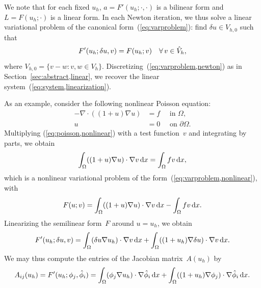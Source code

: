 We note that for each fixed $u_h$, $a = F'(u_h; \cdot, \cdot)$ is a
bilinear form and $L = F(u_h; \cdot)$ is a linear form. In each Newton
iteration, we thus solve a linear variational problem of the canonical
form~(\ref{eq:varproblem}): find $\delta u \in V_{h,0}$ such that
\begin{equation} \label{eq:varproblem,newton}
    F'(u_h; \delta u, v) = F(u_h; v) \quad \forall\, v \in \hat{V}_h,
\end{equation}
where $V_{h,0} = \{v - w: v, w \in
V_h\}$. Discretizing~(\ref{eq:varproblem,newton}) as in
Section~\ref{sec:abstract,linear}, we recover the linear
system~(\ref{eq:system,linearization}).

\begin{example}

As an example, consider the following nonlinear Poisson equation:
\begin{equation} \label{eq:poisson,nonlinear}
  \begin{split}
    - \nabla \cdot ((1+u) \nabla u) &= f \quad \mbox{ in } \Omega,
    \\
    u &= 0 \quad \mbox{ on } \partial\Omega.
  \end{split}
\end{equation}
Multiplying (\ref{eq:poisson,nonlinear}) with a test function~$v$ and
integrating by parts, we obtain
\begin{equation}
  \int_{\Omega} ((1+u) \nabla u) \cdot \nabla v \, \mathrm{d}x =
  \int_{\Omega} f v \, \mathrm{d}x,
\end{equation}
which is a nonlinear variational problem of the
form~(\ref{eq:varproblem,nonlinear}), with
\begin{equation}
  F(u; v) = \int_{\Omega} ((1+u) \nabla u) \cdot \nabla v \, \mathrm{d}x
  - \int_{\Omega} f v \, \mathrm{d}x.
\end{equation}
Linearizing the semilinear form~$F$ around $u = u_h$, we obtain
\begin{equation}
  F'(u_h; \delta u, v) =
  \int_{\Omega} (\delta u \nabla u_h) \cdot \nabla v \, \mathrm{d}x +
  \int_{\Omega} ((1 + u_h) \nabla \delta u) \cdot \nabla v \, \mathrm{d}x.
\end{equation}
We may thus compute the entries of the Jacobian matrix~$A(u_h)$ by
\begin{equation}
  A_{ij}(u_h) = F'(u_h; \phi_j, \hat{\phi}_i) =
  \int_{\Omega} (\phi_j \nabla u_h) \cdot \nabla \hat{\phi}_i \, \mathrm{d}x +
  \int_{\Omega} ((1 + u_h) \nabla \phi_j) \cdot \nabla \hat{\phi}_i \, \mathrm{d}x.
\end{equation}

\end{example}

